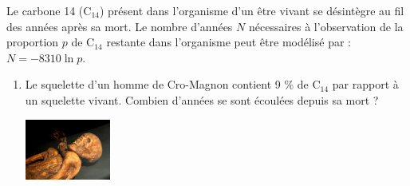 \documentclass[a4paper,11pt,exos]{nsi} %
\begin{document}
\newpage
\exo{}
Le carbone 14 (C$_{14}$) présent dans l'organisme d'un être vivant se désintègre au fil des années après sa mort. Le nombre d'années $N$ nécessaires à l'observation de la proportion $p$ de C$_{14}$ restante dans l'organisme peut être modélisé par : $N=-8310 \ln p$.
\begin{enumerate}
    \item Le squelette d'un homme de Cro-Magnon contient 9 \% de C$_{14}$ par rapport à un squelette vivant. Combien d'années se sont écoulées depuis sa mort ?

    {\includegraphics[width=2.8cm]{Otzi-Quinson.jpg}}
\end{enumerate}
\end{document}
